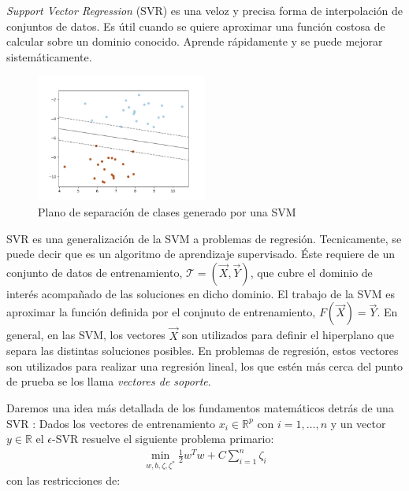     \par \textit{Support Vector Regression} (SVR)\cite{support_vector_regression, review_svr}
      es una veloz y precisa forma de interpolación de conjuntos de datos.
      Es útil cuando se quiere aproximar una función costosa de calcular sobre un
      dominio conocido. Aprende rápidamente y se puede mejorar sistemáticamente.

      \begin{figure}
      \centering%
      \includegraphics[width=0.5\textwidth]{images/svm_hiperplane}%
      \caption{Plano de separación de clases generado por una SVM}\label{fig:svm}
      \end{figure}

    \par SVR es una generalización de la SVM a problemas de regresión. Tecnicamente,
      se puede decir que es un algoritmo de aprendizaje supervisado. Éste
      requiere de un conjunto de datos de entrenamiento,
      $\mathcal{T} = (\vec{X}, \vec{Y})$, que cubre el dominio de interés acompañado
      de las soluciones en dicho dominio. El trabajo de la SVM es aproximar la función
      definida por el conjnuto de entrenamiento, $F(\vec{X}) = \vec{Y}$. En general,
      en las SVM, los vectores $\vec{X}$ son utilizados para definir el hiperplano que
      separa las distintas soluciones posibles. En problemas de regresión, estos
      vectores son utilizados para realizar una regresión lineal, los que estén
      más cerca del punto de prueba se los llama \textit{vectores de soporte}.

      Daremos una idea más detallada de los fundamentos matemáticos detrás de una
      SVR \cite{svr_tutorial}:
      Dados los vectores de entrenamiento $x_{i} \in \mathbb{R}^{p}$ con $i = 1, \dots ,n$
      y un vector $y \in \mathbb{R}$ el $\epsilon$-SVR resuelve el siguiente problema
      primario:
      \pagebreak
      \begin{align}
        \min\limits_{w, b, \zeta, \zeta^{*}} \frac{1}{2} w^{T} w + C \sum_{i = 1}^{n} \zeta_{i}
      \end{align}
      con las restricciones de:


